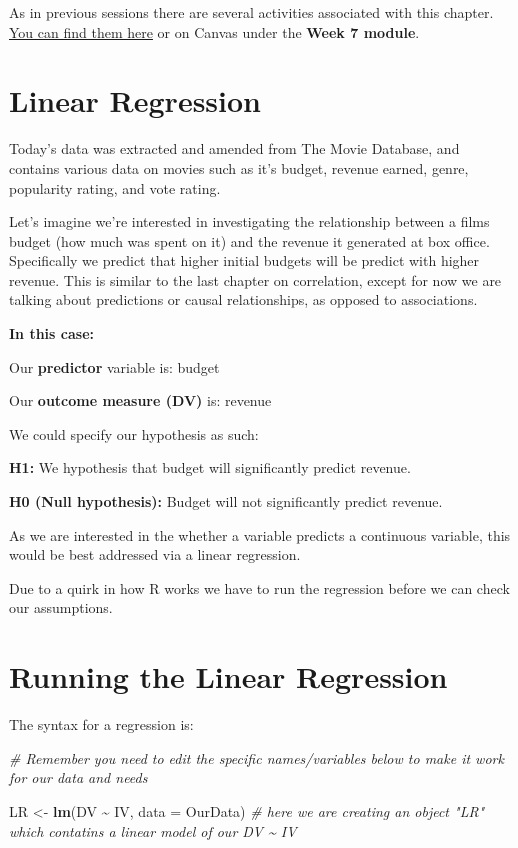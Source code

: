 \documentclass[
]{book}
\newenvironment{Shaded}{\begin{snugshade}}{\end{snugshade}}
\newcommand{\AttributeTok}[1]{\textcolor[rgb]{0.13,0.29,0.53}{#1}}
\newcommand{\CommentTok}[1]{\textcolor[rgb]{0.56,0.35,0.01}{\textit{#1}}}
\newcommand{\FunctionTok}[1]{\textcolor[rgb]{0.13,0.29,0.53}{\textbf{#1}}}
\newcommand{\NormalTok}[1]{#1}
\newcommand{\OtherTok}[1]{\textcolor[rgb]{0.56,0.35,0.01}{#1}}
\newcommand{\SpecialCharTok}[1]{\textcolor[rgb]{0.81,0.36,0.00}{\textbf{#1}}}
\begin{document}
As in previous sessions there are several activities associated with this chapter. \href{https://ryandonovan.quarto.pub/week7---activities/}{You can find them here} or on Canvas under the \textbf{Week 7 module}.

\section{Linear Regression}\label{linear-regression}

Today's data was extracted and amended from The Movie Database, and contains various data on movies such as it's budget, revenue earned, genre, popularity rating, and vote rating.

Let's imagine we're interested in investigating the relationship between a films budget (how much was spent on it) and the revenue it generated at box office. Specifically we predict that higher initial budgets will be predict with higher revenue. This is similar to the last chapter on correlation, except for now we are talking about predictions or causal relationships, as opposed to associations.

\textbf{In this case:}

Our \textbf{predictor} variable is: budget

Our \textbf{outcome measure (DV)} is: revenue

We could specify our hypothesis as such:

\textbf{H1:} We hypothesis that budget will significantly predict revenue.

\textbf{H0 (Null hypothesis):} Budget will not significantly predict revenue.

As we are interested in the whether a variable predicts a continuous variable, this would be best addressed via a linear regression.

Due to a quirk in how R works we have to run the regression before we can check our assumptions.

\section{Running the Linear Regression}\label{running-the-linear-regression}

The syntax for a regression is:

\begin{Shaded}
\begin{Highlighting}[]
\CommentTok{\# Remember you need to edit the specific names/variables below to make it work for our data and needs}

\NormalTok{LR }\OtherTok{\textless{}{-}} \FunctionTok{lm}\NormalTok{(DV }\SpecialCharTok{\textasciitilde{}}\NormalTok{ IV, }\AttributeTok{data =}\NormalTok{ OurData) }\CommentTok{\# here we are creating an object "LR" which contatins a linear model of our DV \textasciitilde{} IV }
\end{Highlighting}
\end{Shaded}
\end{document}
